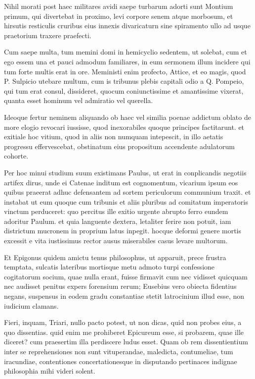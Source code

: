 \documentclass[12pt]{article}
\begin{document}
Nihil morati post haec militares avidi saepe turbarum adorti sunt Montium primum, qui divertebat in proximo, levi corpore senem atque morbosum, et hirsutis resticulis cruribus eius innexis divaricaturn sine spiramento ullo ad usque praetorium traxere praefecti.

Cum saepe multa, tum memini domi in hemicyclio sedentem, ut solebat, cum et ego essem una et pauci admodum familiares, in eum sermonem illum incidere qui tum forte multis erat in ore. Meministi enim profecto, Attice, et eo magis, quod P. Sulpicio utebare multum, cum is tribunus plebis capitali odio a Q. Pompeio, qui tum erat consul, dissideret, quocum coniunctissime et amantissime vixerat, quanta esset hominum vel admiratio vel querella.

Ideoque fertur neminem aliquando ob haec vel similia poenae addictum oblato de more elogio revocari iussisse, quod inexorabiles quoque principes factitarunt. et exitiale hoc vitium, quod in aliis non numquam intepescit, in illo aetatis progressu effervescebat, obstinatum eius propositum accendente adulatorum cohorte.

Per hoc minui studium suum existimans Paulus, ut erat in conplicandis negotiis artifex dirus, unde ei Catenae inditum est cognomentum, vicarium ipsum eos quibus praeerat adhuc defensantem ad sortem periculorum communium traxit. et instabat ut eum quoque cum tribunis et aliis pluribus ad comitatum imperatoris vinctum perduceret: quo percitus ille exitio urgente abrupto ferro eundem adoritur Paulum. et quia languente dextera, letaliter ferire non potuit, iam districtum mucronem in proprium latus inpegit. hocque deformi genere mortis excessit e vita iustissimus rector ausus miserabiles casus levare multorum.

Et Epigonus quidem amictu tenus philosophus, ut apparuit, prece frustra temptata, sulcatis lateribus mortisque metu admoto turpi confessione cogitatorum socium, quae nulla erant, fuisse firmavit cum nec vidisset quicquam nec audisset penitus expers forensium rerum; Eusebius vero obiecta fidentius negans, suspensus in eodem gradu constantiae stetit latrocinium illud esse, non iudicium clamans.

Fieri, inquam, Triari, nullo pacto potest, ut non dicas, quid non probes eius, a quo dissentias. quid enim me prohiberet Epicureum esse, si probarem, quae ille diceret? cum praesertim illa perdiscere ludus esset. Quam ob rem dissentientium inter se reprehensiones non sunt vituperandae, maledicta, contumeliae, tum iracundiae, contentiones concertationesque in disputando pertinaces indignae philosophia mihi videri solent.






\newpage
\thispagestyle{empty}
\pagestyle{fancyplain} \chead{} 
\listoffigures
\end{document}

